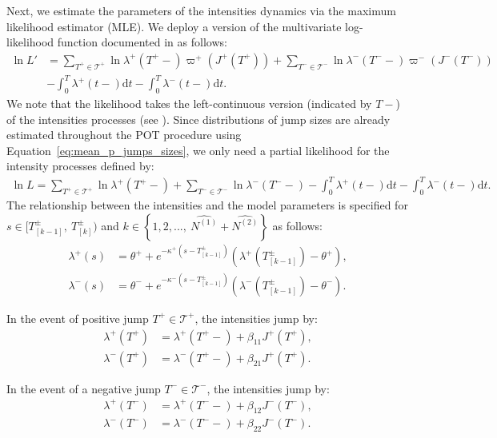 \documentclass[11pt,a4paper]{article}
\numberwithin{equation}{section}
\theoremstyle{remark}
\theoremstyle{definition}
\begin{document}
Next, we estimate the parameters of the intensities dynamics via the maximum likelihood estimator (MLE). We deploy a version of the multivariate log-likelihood function documented in \cite{embrechts2011multivariate} as follows:
 \begin{align}
  \ln L' &= \sum_{T^+ \in \mathcal{T}^+} \ln \lambda^+(T^+-)\varpi^+(J^+(T^+))
          + \sum_{T^- \in \mathcal{T}^-} \ln \lambda^-(T^--)\varpi^-(J^-(T^-)) \nonumber\\
  &- \int_0^T \lambda^+(t-)\text{d}t
  - \int_0^T \lambda^-(t-)\text{d}t. %
 \end{align}
We note that the likelihood takes the left-continuous version (indicated by $T-$) of the intensities processes (see \citep[p. 232]{daley2003introduction}). Since distributions of jump sizes are already estimated throughout the POT procedure using Equation~\eqref{eq:mean_p_jumps_sizes}, we only need a partial likelihood for the intensity processes defined by:
\begin{align}
  \ln L = \sum_{T^+ \in \mathcal{T}^+} \ln \lambda^+(T^+-)
  +
   \sum_{T^- \in \mathcal{T}^-} \ln \lambda^-(T^--)
  - \int_0^T \lambda^+(t-)\text{d}t
  - \int_0^T \lambda^-(t-)\text{d}t. \label{eq:likelihood}
 \end{align}
The relationship between the intensities and the model parameters is specified for $s \in [T_{[k-1]}^\pm,\ T_{[k]}^\pm)$ and $k \in \left\{1,2,...,\ \widehat{N^{(1)}}+\widehat{N^{(2)}}\right\}$ as follows:
 \begin{align}
  \lambda^+(s) &= \theta^+ + e^{-\kappa^+\left(s - T_{[k-1]}^\pm\right)}\left(\lambda^+(T_{[k-1]}^\pm)-\theta^+\right),\\
  \lambda^-(s) &= \theta^- + e^{-\kappa^-\left(s - T_{[k-1]}^\pm\right)}\left(\lambda^-(T_{[k-1]}^\pm)-\theta^-\right).
 \end{align}

In the event of positive jump $T^+ \in \mathcal{T}^+$, the intensities jump by:
\begin{equation}
    \begin{split}
  \lambda^+(T^+) &= \lambda^+(T^+-) + \beta_{11}J^+(T^+),\\
  \lambda^-(T^+) &= \lambda^-(T^+-) + \beta_{21}J^+(T^+).
    \end{split}
\end{equation}

In the event of a negative jump $T^- \in \mathcal{T}^-$, the intensities jump by:
\begin{equation}
    \begin{split}
  \lambda^+(T^-) &= \lambda^+(T^--) + \beta_{12}J^-(T^-),\\
  \lambda^-(T^-) &= \lambda^-(T^--) + \beta_{22}J^-(T^-).
    \end{split}
\end{equation}
\end{document}
